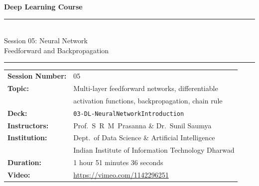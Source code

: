 \documentclass[12pt,a4paper]{article}
\begin{document}
\begin{titlepage}
  \centering
  \vspace*{2cm}

  {\LARGE\bfseries Deep Learning Course\\[0.4em]
   \rule{\linewidth}{0.5pt}\\[0.6em]
   Session 05: Neural Network\\Feedforward and Backpropagation\\
   \rule{\linewidth}{0.5pt}}

  \vspace{1.5cm}

  \begin{tcolorbox}[colback=blue!5!white,colframe=blue!50!black,width=0.85\linewidth]
    \centering
    \begin{tabular}{ll}
      \textbf{Session Number:} & 05 \\[4pt]
      \textbf{Topic:}          & Multi-layer feedforward networks, differentiable \\
                               & activation functions, backpropagation, chain rule \\[4pt]
      \textbf{Deck:}           & \texttt{03-DL-NeuralNetworkIntroduction} \\[4pt]
      \textbf{Instructors:}    & Prof.\ S~R~M~Prasanna \& Dr.\ Sunil Saumya \\[4pt]
      \textbf{Institution:}    & Dept.\ of Data Science \& Artificial Intelligence \\
                               & Indian Institute of Information Technology Dharwad \\[4pt]
      \textbf{Duration:}       & 1 hour 51 minutes 36 seconds \\[4pt]
      \textbf{Video:}          & \url{https://vimeo.com/1142296251} \\
    \end{tabular}
  \end{tcolorbox}

  \vspace{1.5cm}


\end{titlepage}
\end{document}
